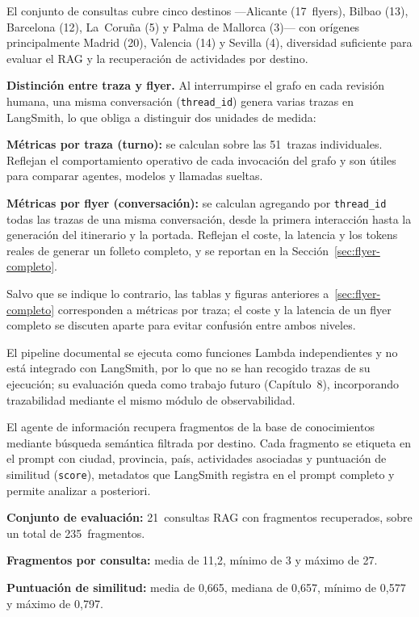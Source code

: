 El conjunto de consultas cubre cinco destinos ---Alicante (17~flyers), Bilbao (13), Barcelona (12), La~Coruña (5) y Palma de Mallorca (3)--- con orígenes principalmente Madrid (20), Valencia (14) y Sevilla (4), diversidad suficiente para evaluar el RAG y la recuperación de actividades por destino.

\textbf{Distinción entre traza y flyer.} Al interrumpirse el grafo en cada revisión humana, una misma conversación (\texttt{thread\_id}) genera varias trazas en LangSmith, lo que obliga a distinguir dos unidades de medida:
\begin{tfmbullets}
\item \textbf{Métricas por traza (turno):} se calculan sobre las 51~trazas individuales. Reflejan el comportamiento operativo de cada invocación del grafo y son útiles para comparar agentes, modelos y llamadas sueltas.
\item \textbf{Métricas por flyer (conversación):} se calculan agregando por \texttt{thread\_id} todas las trazas de una misma conversación, desde la primera interacción hasta la generación del itinerario y la portada. Reflejan el coste, la latencia y los tokens reales de generar un folleto completo, y se reportan en la Sección~\ref{sec:flyer-completo}.
\end{tfmbullets}
Salvo que se indique lo contrario, las tablas y figuras anteriores a~\ref{sec:flyer-completo} corresponden a métricas por traza; el coste y la latencia de un flyer completo se discuten aparte para evitar confusión entre ambos niveles.

El pipeline documental se ejecuta como funciones Lambda independientes y no está integrado con LangSmith, por lo que no se han recogido trazas de su ejecución; su evaluación queda como trabajo futuro (Capítulo~8), incorporando trazabilidad mediante el mismo módulo de observabilidad.

El agente de información recupera fragmentos de la base de conocimientos mediante búsqueda semántica filtrada por destino. Cada fragmento se etiqueta en el prompt con ciudad, provincia, país, actividades asociadas y puntuación de similitud (\texttt{score}), metadatos que LangSmith registra en el prompt completo y permite analizar a posteriori.

\begin{tfmbullets}
\item \textbf{Conjunto de evaluación:} 21~consultas RAG con fragmentos recuperados, sobre un total de 235~fragmentos.
\item \textbf{Fragmentos por consulta:} media de 11{,}2, mínimo de 3 y máximo de 27.
\item \textbf{Puntuación de similitud:} media de 0{,}665, mediana de 0{,}657, mínimo de 0{,}577 y máximo de 0{,}797.
\end{tfmbullets}

